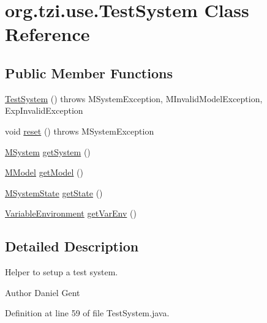 \hypertarget{classorg_1_1tzi_1_1use_1_1_test_system}{\section{org.\-tzi.\-use.\-Test\-System Class Reference}
\label{classorg_1_1tzi_1_1use_1_1_test_system}
}
\subsection*{Public Member Functions}
\begin{DoxyCompactItemize}
\item 
\hyperlink{classorg_1_1tzi_1_1use_1_1_test_system_a4b0d3aff4807956407f0874e3dc368ab}{Test\-System} ()  throws M\-System\-Exception, M\-Invalid\-Model\-Exception, Exp\-Invalid\-Exception 
\item 
void \hyperlink{classorg_1_1tzi_1_1use_1_1_test_system_a9f642cbf76d00555d2c23d1aa4eca978}{reset} ()  throws M\-System\-Exception 
\item 
\hyperlink{classorg_1_1tzi_1_1use_1_1uml_1_1sys_1_1_m_system}{M\-System} \hyperlink{classorg_1_1tzi_1_1use_1_1_test_system_a3245b7d93b96d36a819c99b8978fee14}{get\-System} ()
\item 
\hyperlink{classorg_1_1tzi_1_1use_1_1uml_1_1mm_1_1_m_model}{M\-Model} \hyperlink{classorg_1_1tzi_1_1use_1_1_test_system_a56aa1ea31b1c1222edf88d0005e78b9a}{get\-Model} ()
\item 
\hyperlink{classorg_1_1tzi_1_1use_1_1uml_1_1sys_1_1_m_system_state}{M\-System\-State} \hyperlink{classorg_1_1tzi_1_1use_1_1_test_system_a162db49eba31cbc79fcebe49da537d92}{get\-State} ()
\item 
\hyperlink{classorg_1_1tzi_1_1use_1_1util_1_1soil_1_1_variable_environment}{Variable\-Environment} \hyperlink{classorg_1_1tzi_1_1use_1_1_test_system_a2b92647cf4d8a1213939f75b1c462ccb}{get\-Var\-Env} ()
\end{DoxyCompactItemize}


\subsection{Detailed Description}
Helper to setup a test system. \begin{DoxyAuthor}{Author}
Daniel Gent 
\end{DoxyAuthor}


Definition at line 59 of file Test\-System.\-java.



